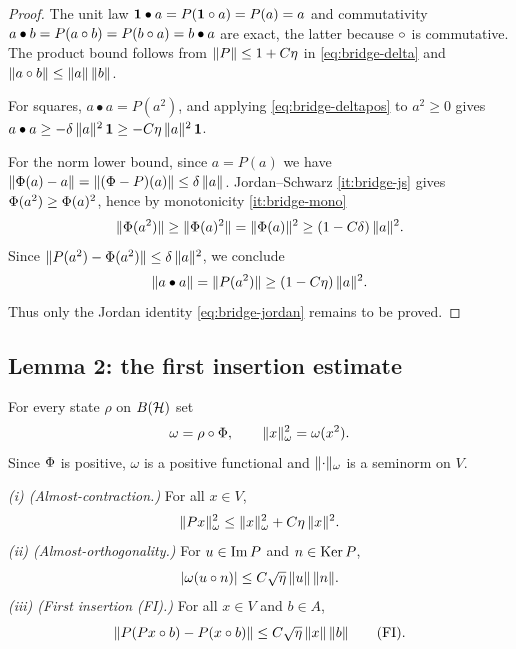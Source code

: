 \begin{proof}
The unit law $\mathbf{1}\bullet a=P(\mathbf{1}\circ a)=P(a)=a$ and commutativity
$a\bullet b=P(a\circ b)=P(b\circ a)=b\bullet a$ are exact, the latter because
$\circ$ is commutative. The product bound follows from $\lVert P \rVert\le1+C\eta$ in
\eqref{eq:bridge-delta} and $\lVert a\circ b \rVert\le\lVert a \rVert\,\lVert b \rVert$.

For squares, $a\bullet a=P(a^2)$, and applying \eqref{eq:bridge-deltapos} to
$a^2\ge0$ gives $a\bullet a\ge-\delta\,\lVert a \rVert^2\,\mathbf{1}\ge-C\eta\,\lVert a \rVert^2\,\mathbf{1}$.

For the norm lower bound, since $a=P(a)$ we have
$\lVert \Phi(a)-a \rVert=\lVert (\Phi-P)(a) \rVert\le\delta\,\lVert a \rVert$. Jordan--Schwarz
\ref{it:bridge-js} gives $\Phi(a^2)\ge\Phi(a)^2$, hence by
monotonicity \ref{it:bridge-mono}
\[
  \lVert \Phi(a^2) \rVert\ge\lVert \Phi(a)^2 \rVert=\lVert \Phi(a) \rVert^2
    \ge(1-C\delta)\,\lVert a \rVert^2.
\]
Since $\lVert P(a^2)-\Phi(a^2) \rVert\le\delta\,\lVert a \rVert^2$, we conclude
\[
  \lVert a\bullet a \rVert=\lVert P(a^2) \rVert\ge(1-C\eta)\,\lVert a \rVert^2.
\]
Thus only the Jordan identity \eqref{eq:bridge-jordan} remains to be proved.
\end{proof}

\subsection*{Lemma 2: the first insertion estimate}

For every state $\rho$ on $B(\mathcal{H})$ set
\begin{equation}\label{eq:bridge-omega}
  \omega=\rho\circ\Phi,\qquad \lVert x \rVert_\omega^2=\omega(x^2).
\end{equation}
Since $\Phi$ is positive, $\omega$ is a positive functional and
$\lVert \cdot \rVert_\omega$ is a seminorm on $V$.

\begin{lemma}\label{lem:bridge-fi}
\emph{(i) (Almost-contraction.)} For all $x\in V$,
\begin{equation}\label{eq:bridge-almostcontr}
  \lVert Px \rVert_\omega^2\le\lVert x \rVert_\omega^2+C\eta\,\lVert x \rVert^2.
\end{equation}
\emph{(ii) (Almost-orthogonality.)} For $u\in\operatorname{Im} P$ and $n\in\operatorname{Ker} P$,
\begin{equation}\label{eq:bridge-almostorth}
  \lvert\omega(u\circ n)\rvert\le C\sqrt\eta\,\lVert u \rVert\,\lVert n \rVert.
\end{equation}
\emph{(iii) (First insertion (FI).)} For all $x\in V$ and $b\in A$,
\begin{equation}\label{eq:bridge-FI}
  \lVert P(Px\circ b)-P(x\circ b) \rVert\le C\sqrt\eta\,\lVert x \rVert\,\lVert b \rVert
  \qquad\text{\normalfont(FI)}.
\end{equation}
\end{lemma}

